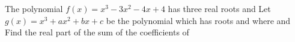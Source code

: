 The polynomial $f(x)=x^3-3x^2-4x+4$ has three real roots   and   Let $g(x)=x^3+ax^2+bx+c$ be the polynomial which has roots   and  where    and   Find the real part of the sum of the coefficients of 